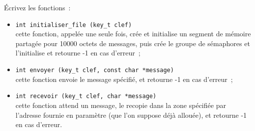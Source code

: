 Écrivez les fonctions~:

\begin {itemize}
    \item \verb|int initialiser_file (key_t clef)| \\
	cette fonction, appelée une seule fois, crée et initialise un
	segment de mémoire partagée pour 10000 octets de messages, puis
	crée le groupe de sémaphores et l'initialise et retourne -1 en
	cas d'erreur~;

    \item \verb|int envoyer (key_t clef, const char *message)| \\
	cette fonction envoie le message spécifié, et retourne -1 en cas
	d'erreur~;

    \item \verb|int recevoir (key_t clef, char *message)| \\
	cette fonction attend un message, le recopie dans la zone
	spécifiée par l'adresse fournie en paramètre (que l'on suppose
	déjà allouée), et retourne -1 en cas d'erreur.

\end {itemize}

